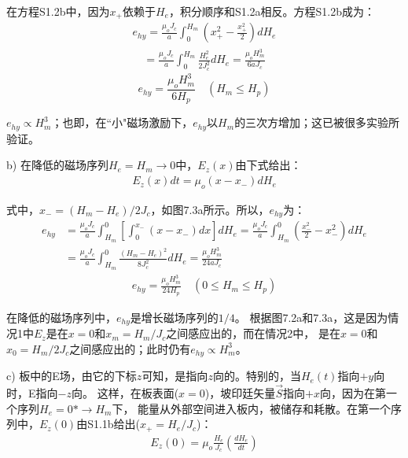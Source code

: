 在方程S1.2b中，因为$x_+$依赖于$H_e$，积分顺序和S1.2a相反。方程S1.2b成为：
\begin{align*}%
e_{hy}=\frac{\mu_oJ_c}{a}\int_{0}^{H_m}\left(x_{+}^{2}-\frac{x_{+}^{2}}{2}\right)dH_e  \tag{S1.2c}
\end{align*}
\begin{align*}
=\frac{\mu_oJ_c}{a}\int_{0}^{H_m}\frac{H_{e}^{2}}{2J_{c}^{2}}dH_e=\frac{\mu_oH_{m}^{3}}{6aJ_c} \tag{S1.2d}
\end{align*}
\begin{equation}%
e_{hy}=\frac{\mu_oH_{m}^{3}}{6H_p} \quad   (H_m\leq H_p) \tag{7.13a}
\end{equation}

$e_{hy}\propto H_m^3$；也即，在``小"磁场激励下，$e_{hy}$以$H_m$的三次方增加；这已被很多实验所验证。

b) 在降低的磁场序列$H_e=H_m\rightarrow 0$中，$E_z(x)$由下式给出：
\begin{align*}%
E_z(x)dt=\mu_o(x-x_-)dH_e \tag{S1.3}
\end{align*}

式中，$x_-=(H_m-H_e)/2J_c$，如图7.3a所示。所以，$e_{hy}$为：
\begin{align*}%
e_{hy}&=\frac{\mu_oJ_c}{a}\int_{H_m}^{0}\left[\int_{0}^{x_-}(x-x_-)dx\right]dH_e=\frac{\mu_oJ_c}{a}\int_{H_m}^{0}\left(\frac{x_{-}^{2}}{2}-x_{-}^{2}\right)dH_e \\\tag{S1.4}
&=\frac{\mu_oJ_c}{a}\int_{H_m}^{0}\frac{(H_m-H_e)^2}{8J_{c}^{2}}dH_e=\frac{\mu_oH_{m}^{3}}{24aJ_c}
\end{align*}
\begin{align*}%
e_{hy}=\frac{\mu_oH_{m}^{3}}{24H_p}  \quad     (0\leq H_m\leq H_p) \tag{7.14a}
\end{align*}

在降低的磁场序列中，$e_{hy}$是增长磁场序列的$1/4$。
根据图7.2a和7.3a，这是因为情况1中$E_z$是在$x=0$和$x_m=H_m/J_c$之间感应出的，而在情况2中，
是在$x=0$和$x_0=H_m/2J_c$之间感应出的；此时仍有$e_{hy}\propto H_m^3$。

c) 板中的E场，由它的下标$z$可知，是指向$z$向的。特别的，当$H_e(t)$指向$+y$向时，E指向$-z$向。
这样，在板表面($x=0$)，坡印廷矢量$\vec{S}$指向$+x$向，因为在第一个序列$H_e=0*\rightarrow H_m$下，
能量从外部空间进入板内，被储存和耗散。在第一个序列中，$E_z(0)$由S1.1b给出($x_+=H_e/J_c$)：
\begin{align*}%
E_z(0)=\mu_o\frac{H_e}{J_c}\left(\frac{dH_e}{dt}\right) \tag{S1.5a}
\end{align*}

